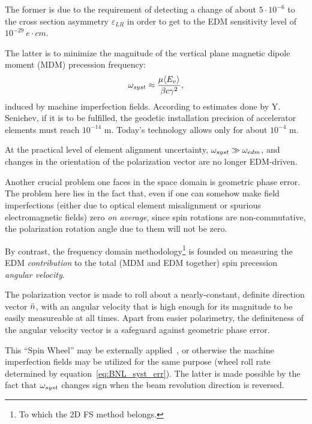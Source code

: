The former is due to the requirement of detecting a change of about $5\cdot 10^{-6}$ to the
cross section asymmetry $\varepsilon_{LR}$ in order to get to the EDM sensitivity level
of $10^{-29}~e\cdot cm$.~\cite[p.~18]{BNL:Deuteron2008}

The latter is to minimize the magnitude of the vertical plane magnetic dipole 
moment (MDM) precession frequency:~\cite[p.~11]{BNL:Deuteron2008}
\begin{equation}\label{eq:BNL_syst_err}
\w_{syst} \approx \frac{\mu\avg{E_v}}{\beta c\gamma^2},
\end{equation}
induced by machine imperfection fields. According to estimates done by Y. Senichev, if it is to be fulfilled,
the geodetic installation precision of accelerator elements must reach $10^{-14}$ m. Today's technology
allows only for about $10^{-4}$ m.

At the practical level of element alignment uncertainty, $\omega_{syst} \gg \omega_{edm}$,
and changes in the orientation of the polarization vector are no longer EDM-driven.

Another crucial problem one faces in the space domain is geometric phase error.~\cite[p.~6]{BNL:Proton}
The problem here lies in the fact that, even if one can somehow make field imperfections (either due to
optical element misalignment or spurious electromagnetic fields) zero
\emph{on average}, since spin rotations are non-commutative, the polarization rotation angle due to them
will not be zero.

By contrast, the frequency domain methodology\footnote{To which the 2D FS method belongs.} is founded on
measuring the EDM \emph{contribution} to the total (MDM and EDM together) spin precession \emph{angular velocity}.

The polarization vector is made to roll about a nearly-constant, definite direction vector $\bar n$,
with an angular velocity that is high enough for its magnitude to be easily measureable at all times.
Apart from easier polarimetry, the definiteness of the angular velocity vector is a safeguard against geometric
phase error.

This ``Spin Wheel'' may be externally applied~\cite{Koop:SW}, or otherwise the machine imperfection fields
may be utilized for the same purpose (wheel roll rate determined by equation~\eqref{eq:BNL_syst_err}).
The latter is made possible by the fact that $\omega_{syst}$ changes sign when the beam revolution direction
is reversed.~\cite[p.~11]{BNL:Deuteron2008}

